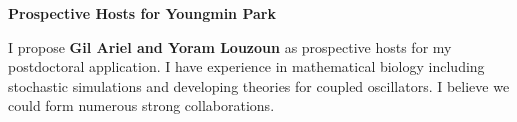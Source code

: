 \documentclass[a4paper,11pt]{article}
\begin{document}
\begin{center}
\Large \textbf{Prospective Hosts for Youngmin Park}
\end{center}

I propose \textbf{Gil Ariel and Yoram Louzoun} as prospective hosts for my postdoctoral application. I have experience in mathematical biology including stochastic simulations and developing theories for coupled oscillators. I believe we could form numerous strong collaborations.
\end{document}
